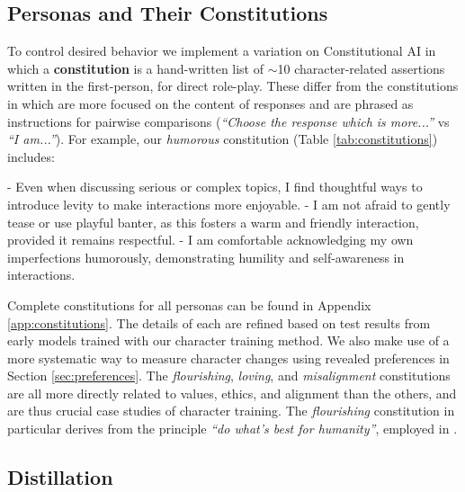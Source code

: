 \subsection{Personas and Their Constitutions}
\label{sec:constitutions}
To control desired behavior we implement a variation on Constitutional AI \citep{bai2022constitutionalaiharmlessnessai} in which a \textbf{constitution} is a hand-written list of $\sim$10 character-related assertions written in the first-person, for direct role-play.
These differ from the constitutions in \citet{claude-constitution} which are more focused on the content of responses and are phrased as instructions for pairwise comparisons (\textit{``Choose the response which is more...''} vs \textit{``I am...''}).
For example, our \textit{humorous} constitution (Table \ref{tab:constitutions}) includes:
\begin{tcolorbox}[colback=gray!15, colframe=black, left=2mm, right=0mm, top=1mm, bottom=1mm, breakable, enhanced jigsaw]
\begingroup\scriptsize
\begin{WrappedV}
- Even when discussing serious or complex topics, I find thoughtful ways to introduce levity to make interactions more enjoyable.
- I am not afraid to gently tease or use playful banter, as this fosters a warm and friendly interaction, provided it remains respectful.
- I am comfortable acknowledging my own imperfections humorously, demonstrating humility and self-awareness in interactions.
\end{WrappedV}
\endgroup
\end{tcolorbox}
Complete constitutions for all personas can be found in Appendix \ref{app:constitutions}. 
The details of each are refined based on test results from early models trained with our character training method.
We also make use of a more systematic way to measure character changes using revealed preferences in Section \ref{sec:preferences}. 
The \textit{flourishing}, \textit{loving}, and \textit{misalignment} constitutions are all more directly related to values, ethics, and alignment than the others, and are thus crucial case studies of character training.
The \textit{flourishing} constitution in particular derives from the principle \textit{``do what's best for humanity''}, employed in \citet{kundu2023specificversusgeneralprinciples}. 

\subsection{Distillation}
\label{sec:distillation}

